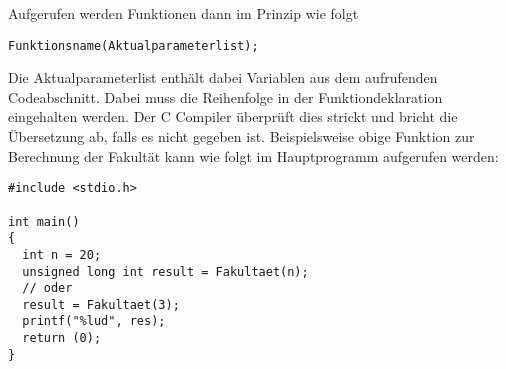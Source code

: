 Aufgerufen werden Funktionen dann im Prinzip wie folgt
\begin{lstlisting}
Funktionsname(Aktualparameterlist);
\end{lstlisting}
Die Aktualparameterlist enthält dabei Variablen aus dem aufrufenden Codeabschnitt.
Dabei muss die Reihenfolge in der Funktiondeklaration eingehalten werden.
Der C Compiler überprüft dies strickt und bricht die Übersetzung ab, falls es nicht gegeben ist.
Beispielsweise obige Funktion zur Berechnung der Fakultät kann wie folgt im Hauptprogramm aufgerufen werden:
\begin{lstlisting}
#include <stdio.h>

int main()
{
  int n = 20;
  unsigned long int result = Fakultaet(n);
  // oder
  result = Fakultaet(3);
  printf("%lud", res);
  return (0);
}
\end{lstlisting}

\endinput
